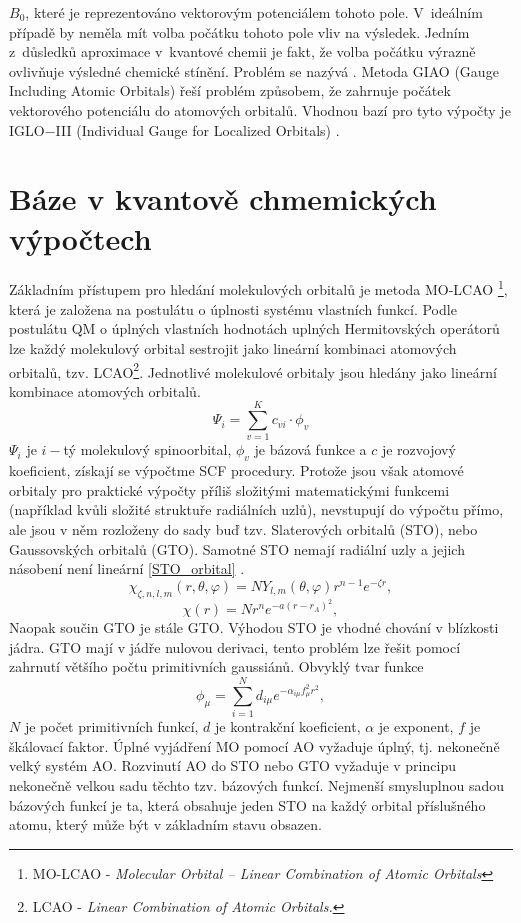 \documentclass[
  digital, %
  table,   %
  lof,     %
  lot,     %
  oneside,
]{fithesis3}
\begin{document}
 $B_0$, které je reprezentováno vektorovým potenciálem tohoto pole. V~ideálním případě by neměla mít volba počátku tohoto pole vliv na výsledek. Jedním z~důsledků aproximace v~kvantové chemii je fakt, že volba počátku výrazně ovlivňuje výsledné chemické stínění. Problém se nazývá . Metoda GIAO (Gauge  Including Atomic Orbitals) řeší problém způsobem, že zahrnuje počátek vektorového potenciálu do atomových orbitalů. Vhodnou bazí pro tyto výpočty je IGLO$-$III \cite{Standara2006thesis} (Individual Gauge for Localized Orbitals) \cite{g09}.

\section{Báze v kvantově chmemických výpočtech}
Základním přístupem pro hledání molekulových orbitalů je metoda MO-LCAO \footnote{MO-LCAO - \textit{Molecular Orbital – Linear Combination of Atomic Orbitals}}, která je založena na postulátu o úplnosti systému vlastních funkcí. Podle postulátu QM o úplných vlastních hodnotách uplných Hermitovských operátorů lze každý molekulový orbital sestrojit jako lineární kombinaci atomových orbitalů, tzv. LCAO\footnote{LCAO - \textit{Linear Combination of Atomic Orbitals.}}. Jednotlivé molekulové orbitaly jsou hledány jako lineární kombinace atomových orbitalů.
\begin{equation}
\Psi_i = \sum_{v=1}^{K}c_{vi} \cdot \phi_{v}
\end{equation}
$\Psi_i$ je $i-$tý molekulový spinoorbital, $\phi_{v}$ je bázová funkce a $c$ je rozvojový koeficient, získají se výpočtme SCF procedury. Protože jsou však atomové orbitaly pro praktické výpočty příliš složitými matematickými funkcemi (například kvůli složité struktuře radiálních uzlů), nevstupují do výpočtu přímo, ale jsou v něm rozloženy do sady buď tzv. Slaterových orbitalů (STO), nebo Gaussovských orbitalů (GTO). Samotné STO nemají radiální uzly a jejich násobení není lineární \ref{STO_orbital} \cite{jensen2007introduction}.
\begin{equation}
\chi_{\zeta, n, l, m}(r, \theta, \varphi) = NY_{l,m} (\theta, \varphi) r^{n-1} e^{-\zeta r},
\label{STO_orbital}
\end{equation}
\begin{equation}
\chi(r) = Nr^n e^{-a(r-r_A)^2},
\end{equation}
 Naopak součin GTO je stále GTO. Výhodou STO je vhodné chování v blízkosti jádra. GTO mají v jádře nulovou derivaci, tento problém lze řešit pomocí zahrnutí většího počtu primitivních gaussiánů. Obvyklý tvar funkce
\begin{equation}
\phi_\mu = \sum_{i=1}^{N}d_{i\mu}e^{-\alpha_{i\mu}f^2_{\mu}r^2},
\end{equation}
$N$ je počet primitivních funkcí, $d$ je kontrakční koeficient, $\alpha$ je exponent, $f$ je škálovací faktor. Úplné vyjádření MO pomocí AO vyžaduje úplný, tj. nekonečně velký systém AO. Rozvinutí AO do STO nebo GTO vyžaduje v principu nekonečně velkou sadu těchto tzv. bázových funkcí. Nejmenší smysluplnou sadou bázových funkcí je ta, která obsahuje jeden STO na každý orbital příslušného atomu, který může být v základním stavu obsazen.
\end{document}
